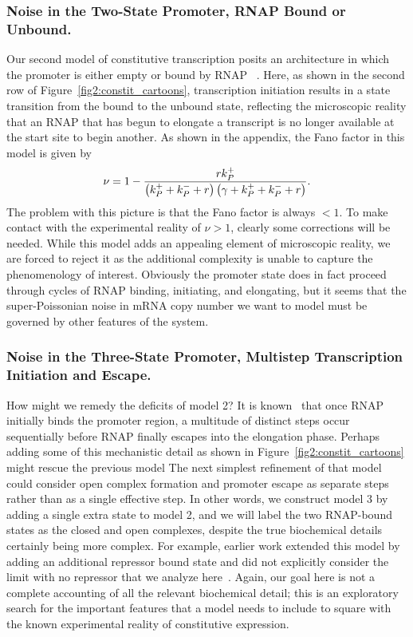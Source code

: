 \subsubsection{Noise in the Two-State Promoter, RNAP Bound or Unbound.}
Our second model of constitutive transcription posits an architecture
in which the promoter is either empty or bound by RNAP
~\cite{Phillips2015a, Phillips2019}. Here,  as shown in 
the second row of Figure~\ref{fig2:constit_cartoons},  transcription initiation results in
a state transition from the bound to
the unbound state, reflecting the microscopic reality that an RNAP that has
begun to elongate a transcript is no longer available at the start site to begin
another.  As shown in the appendix, the Fano factor in this model is given by
\begin{align}
    \nu = 1 -
        \frac{r{k}_{P}^{+}}
            {\left({k}_{P}^{+} + {k}_{P}^{-} + r\right)
             \left(\gamma + {k}_{P}^{+} + {k}_{P}^{-} + r\right)}.
\end{align}
The problem with this picture is that the Fano factor is
 always $<1$. 
 To make contact with the experimental reality of $\nu>1$,
clearly some corrections will be needed.
While this model adds an appealing element of microscopic
reality, we are forced to reject it as the additional complexity is unable to
capture the phenomenology of interest. Obviously the promoter state does in fact
proceed through cycles of RNAP binding, initiating, and elongating, but it seems
that the super-Poissonian noise in mRNA copy number we want to model must be
governed by other features of the system.

\subsubsection{Noise in the Three-State Promoter, Multistep Transcription
Initiation and Escape.} How might we remedy the deficits of model 2? It is
known~\cite{DeHaseth1998} that once RNAP initially binds the promoter region, a
multitude of distinct steps occur sequentially before RNAP finally escapes into
the elongation phase. Perhaps adding some of this mechanistic detail as shown
in Figure~\ref{fig2:constit_cartoons} might
rescue the previous model   The next simplest refinement of that model could consider open
complex formation and promoter escape as separate steps rather than as a single
effective step. In other words, we construct model 3 by adding a single extra
state to model 2, and we will label the two RNAP-bound states as the closed and
open complexes, despite the true biochemical details certainly being more
complex.  For example, earlier work extended this model by adding an additional
repressor bound state and did not explicitly consider the limit with no repressor
that we analyze here~\cite{Mitarai2015}.  Again, our goal here
is not a complete accounting of all the relevant biochemical detail; this is an
exploratory search for the important features that a model needs to include
to square with the known experimental reality of constitutive expression.

